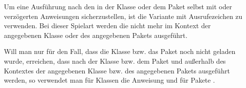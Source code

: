 Um eine Ausführung
nach den in der Klasse oder dem Paket selbst mit  oder
 verzögerten Anweisungen sicherzustellen, ist die
Variante mit Ausrufezeichen zu
verwenden. Bei dieser Spielart werden die  nicht mehr im
Kontext der angegebenen Klasse oder des angegebenen Pakets ausgeführt.

Will man
nur für den Fall, dass die Klasse bzw. das Paket noch nicht geladen wurde,
erreichen, dass  nach der Klasse bzw. dem Paket und
außerhalb des Kontextes der angegebenen Klasse bzw. des angegebenen Pakets
ausgeführt werden, so verwendet man für Klassen die Anweisung
und für Pakete .%
%
